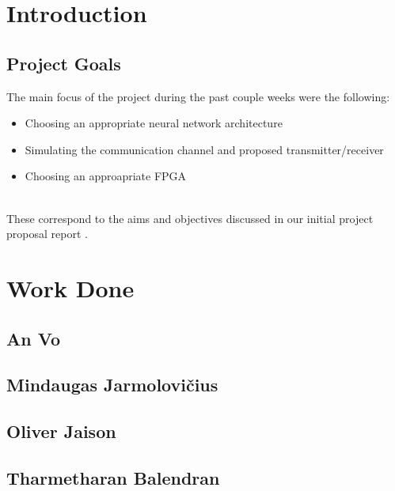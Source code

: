 \documentclass[a4paper,12pt]{article}
\begin{document}
        
	\section{Introduction}
	    \subsection{Project Goals}
	    
	    The main focus of the project during the past couple weeks were the following:
	    
	    \begin{itemize}
            \item Choosing an appropriate neural network architecture
            \item Simulating the communication channel and proposed transmitter/receiver
            \item Choosing an approapriate FPGA
        \end{itemize}
        
	    \\
	    These correspond to the aims and objectives discussed in our initial project proposal report \autocite{proposal_report}. 
	    
	\section{Work Done}
    	\subsection{An Vo}
    	
    	
    	\subsection{Mindaugas Jarmolovi\v{c}ius}
    	
    	
    	\subsection{Oliver Jaison}
    	
    	
    	\subsection{Tharmetharan Balendran}
    	
	
\end{document}
